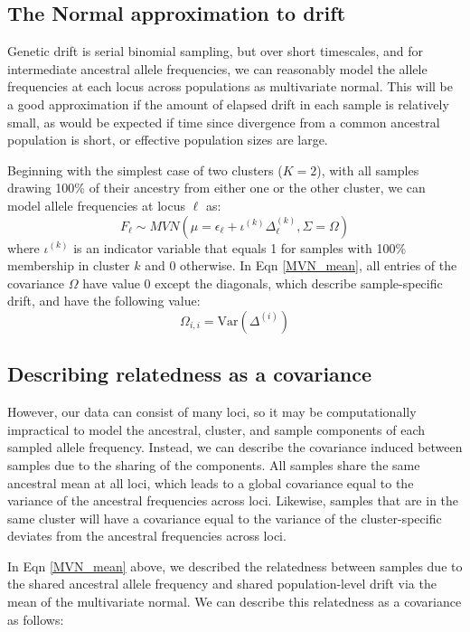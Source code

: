 \documentclass[12pt]{article}
\begin{document}
\subsection{The Normal approximation to drift}
Genetic drift is serial binomial sampling, 
but over short timescales, and for intermediate ancestral allele frequencies, 
we can reasonably model the allele frequencies at each locus across populations as multivariate normal.
This will be a good approximation if the amount of elapsed drift in each sample is relatively small,
as would be expected if time since divergence from a common ancestral population is short,
or effective population sizes are large.

Beginning with the simplest case of two clusters ($K=2$),
with all samples drawing 100\% of their ancestry from either one or the other cluster, 
we can model allele frequencies at locus $\ell$ as:
%
\begin{equation}
F_{\ell} \sim MVN\left(\mu = \epsilon_{\ell} + \iota^{(k)}\Delta_{\ell}^{(k)}, \Sigma = \Omega	\right)
\label{MVN_mean}
\end{equation}
%
where $\iota^{(k)}$ is an indicator variable that equals 1 for samples with 100\% membership in cluster $k$
and 0 otherwise.
In Eqn \eqref{MVN_mean}, all entries of the covariance $\Omega$ have value 0 except the diagonals,
which describe sample-specific drift, and have the following value:
%
\begin{equation}
\Omega_{i,i} = \text{Var}\left( \Delta^{(i)} \right)
\label{MVN_mean_diag}
\end{equation}

%

\subsection{Describing relatedness as a covariance}
However, our data can consist of many loci, 
so it may be computationally impractical to model 
the ancestral, cluster, and sample components of each sampled allele frequency.
Instead, we can describe the covariance induced between samples due to the sharing of the components.
All samples share the same ancestral mean at all loci, 
which leads to a global covariance equal to the variance of the ancestral frequencies across loci.
Likewise, samples that are in the same cluster will have a covariance equal to the variance 
of the cluster-specific deviates from the ancestral frequencies across loci.

In Eqn \ref{MVN_mean} above, we described the relatedness between samples
due to the shared ancestral allele frequency and shared population-level drift
via the mean of the multivariate normal.
We can describe this relatedness as a covariance as follows:
\end{document}
